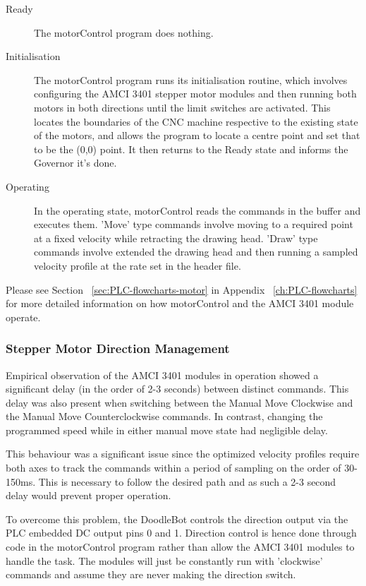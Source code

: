 			\begin{description}
				\item[Ready] The motorControl program does nothing.
				\item[Initialisation] The motorControl program runs its initialisation routine, which involves configuring the AMCI 3401 stepper motor modules and then running both motors in both directions until the limit switches are activated. This locates the boundaries of the CNC machine respective to the existing state of the motors, and allows the program to locate a centre point and set that to be the (0,0) point. It then returns to the Ready state and informs the Governor it's done.
				\item[Operating] In the operating state, motorControl reads the commands in the buffer and executes them. 'Move' type commands involve moving to a required point at a fixed velocity while retracting the drawing head. 'Draw' type commands involve extended the drawing head and then running a sampled velocity profile at the rate set in the header file.
			\end{description}
			
		Please see Section ~\ref{sec:PLC-flowcharts-motor} in Appendix ~\ref{ch:PLC-flowcharts} for more detailed information on how motorControl and the AMCI 3401 module operate.

	\subsubsection{Stepper Motor Direction Management}	
	\label{sec:stepperdirectionmanagement}
			Empirical observation of the AMCI 3401 modules in operation showed a significant delay (in the order of 2-3 seconds) between distinct commands. This delay was also present when switching between the Manual Move Clockwise and the Manual Move Counterclockwise commands. In contrast, changing the programmed speed while in either manual move state had negligible delay.
			
			This behaviour was a significant issue since the optimized velocity profiles require both axes to track the commands within a period of sampling on the order of 30-150ms. This is necessary to follow the desired path and as such a 2-3 second delay would prevent proper operation.
			
			To overcome this problem, the DoodleBot controls the direction output via the PLC embedded DC output pins 0 and 1. Direction control is hence done  through code in the motorControl program rather than allow the AMCI 3401 modules to handle the task. The modules will just be constantly run with 'clockwise' commands and assume they are never making the direction switch. 
			
